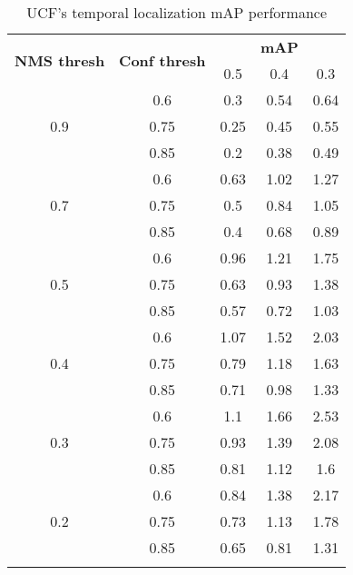 \begin{center}
  \begin{longtable}{|| c | c || c c c ||}

    \hline
    \multirow{2}{*}{\textbf{NMS thresh}} & \multirow{2}{*}{\textbf{Conf thresh}} & {} & \textbf{mAP} & {}  \\
    {} & {} & 0.5 & 0.4 & 0.3\\
    \hline
    \multirow{3}{*}{0.9} & {0.6} & 0.3 & 0.54 & 0.64 \\
    \cline{2-5}
    {} & {0.75} & 0.25 & 0.45 & 0.55 \\
    \cline{2-5}
    {} & {0.85} & 0.2 & 0.38 & 0.49  \\
    \hline
    \multirow{3}{*}{0.7} & {0.6} & 0.63 & 1.02 & 1.27 \\
    \cline{2-5}
    {} & {0.75} & 0.5 & 0.84 & 1.05 \\
    \cline{2-5}
    {} & {0.85} & 0.4 & 0.68 & 0.89 \\
    \hline
    \multirow{3}{*}{0.5} & {0.6} & 0.96 & 1.21 & 1.75 \\
    \cline{2-5}
    {} & {0.75} &  0.63 & 0.93 & 1.38 \\
    \cline{2-5}
    {} & {0.85} & 0.57 & 0.72 & 1.03 \\
    \hline
    \multirow{3}{*}{0.4} & {0.6} & 1.07 & 1.52 & 2.03 \\
    \cline{2-5}
    {} & {0.75} &  0.79 & 1.18 & 1.63 \\
    \cline{2-5}
    {} & {0.85} & 0.71 & 0.98 & 1.33 \\
    \hline
    \multirow{3}{*}{0.3} & {0.6} & 1.1 & 1.66 & 2.53 \\
    \cline{2-5}
    {} & {0.75} &  0.93 & 1.39 & 2.08 \\
    \cline{2-5}
    {} & {0.85} & 0.81 & 1.12 & 1.6 \\
    \hline
    \multirow{3}{*}{0.2} & {0.6} & 0.84 & 1.38 & 2.17 \\
    \cline{2-5}
    {} & {0.75} & 0.73 & 1.13 & 1.78 \\
    \cline{2-5}
    {} & {0.85} & 0.65 & 0.81 & 1.31 \\

    \hline

    \caption{UCF's temporal localization mAP performance}
    \label{table:temp_cls_1}
  \end{longtable}
\end{center}

